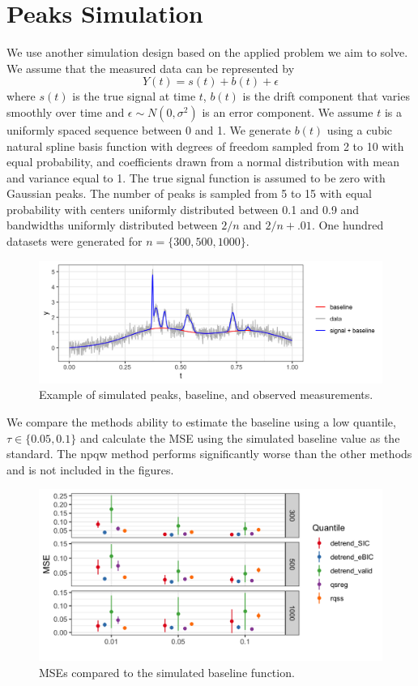 \documentclass[]{article}
\begin{document}
\section{Peaks Simulation}
We use another simulation design based on the applied problem we aim to solve. We assume that the measured data can be represented by 
\begin{equation}
Y(t) = s(t) + b(t) + \epsilon
\end{equation} 
where $s(t)$ is the true signal at time $t$, $b(t)$ is the drift component that varies smoothly over time and $\epsilon \sim N(0, \sigma^2)$ is an error component. We assume $t$ is a uniformly spaced sequence between 0 and 1. We generate $b(t)$ using a cubic natural spline basis function with degrees of freedom sampled from 2 to 10 with equal probability, and coefficients drawn from a normal distribution with mean and variance equal to 1. The true signal function is assumed to be zero with Gaussian peaks. The number of peaks is sampled from 5 to 15 with equal probability with centers uniformly distributed between 0.1 and 0.9 and bandwidths uniformly distributed between $2/n$ and $2/n + .01$. One hundred datasets were generated for $n=\{300,500,1000\}$. 

\begin{figure}
	\caption{Example of simulated peaks, baseline, and observed measurements.}
	\includegraphics[width = \linewidth]{Figures/ex_peaks.png}
\end{figure}

We compare the methods ability to estimate the baseline using a low quantile, $\tau \in \{0.05, 0.1\}$ and calculate the MSE using the simulated baseline value as the standard. The npqw method performs significantly worse than the other methods and is not included in the figures. 

\begin{figure}[h!]
	\caption{MSEs compared to the simulated baseline function.}
	\includegraphics[width = \linewidth]{Figures/peaks_mse.png}
\end{figure}
\end{document}
